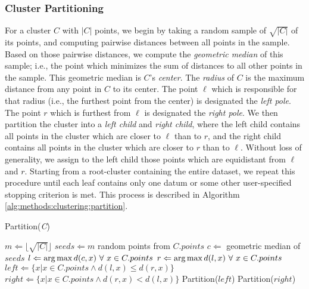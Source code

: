 \subsubsection {Cluster Partitioning}
\label{subsubsec:methods:cluster-partitioning}

For a cluster $C$ with $|C|$ points, we begin by taking a random sample of $\sqrt{|C|}$ of its points, and computing pairwise distances between all points in the sample.
Based on those pairwise distances, we compute the \emph{geometric median} of this sample; 
i.e., the point which minimizes the sum of distances to all other points in the sample.
This geometric median is $C$'s \emph{center}.
The \emph{radius} of $C$ is the maximum distance from any point in $C$ to its center.
The point $\ell$ which is responsible for that radius (i.e., the furthest point from the center) is designated the \emph{left pole}.
The point $r$ which is furthest from $\ell$ is designated the \emph{right pole}.
We then partition the cluster into a \emph{left child} and \emph{right child}, where the left child contains all points in the cluster which are closer to $\ell$ than to $r$, and the right child contains all points in the cluster which are closer to $r$ than to $\ell$.
Without loss of generality, we assign to the left child those points which are equidistant from $\ell$ and $r$.
Starting from a root-cluster containing the entire dataset, we repeat this procedure until each leaf contains only one datum or some other user-specified stopping criterion is met.
This process is described in Algorithm \ref{alg:methods:clustering:partition}.


\begin{algorithm} %
\caption{Partition(\emph{C})} %
\label{alg:methods:clustering:partition} %
\begin{algorithmic} %
    \STATE $m \Leftarrow \lfloor \sqrt{|C|} \rfloor$
    \STATE $seeds \Leftarrow m$ random points from $C.points$
    \STATE $c \Leftarrow$ geometric median of $seeds$
    \STATE $l \Leftarrow \operatorname*{arg\,max} d(c,x) \ \forall \ x \in C.points$
    \STATE $r \Leftarrow \operatorname*{arg\,max} d(l,x) \ \forall \ x \in C.points$
    \STATE $left \Leftarrow \{x | x \in C.points \land d(l,x) \le d(r,x)\}$
    \STATE $right \Leftarrow \{x | x \in C.points \land d(r,x) < d(l,x)\}$
        \STATE Partition($left$)
    \ENDIF
        \STATE Partition($right$)
    \ENDIF
\end{algorithmic}
\end{algorithm}


